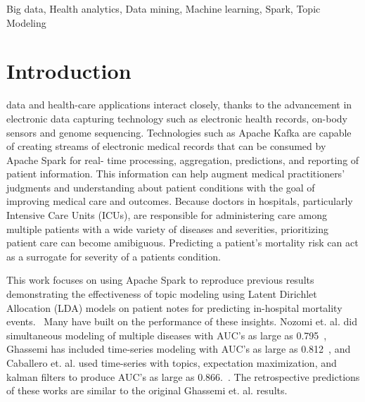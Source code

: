 \documentclass[journal]{IEEEtran}
\begin{document}
\begin{IEEEkeywords}
Big data, Health analytics, Data mining, Machine learning, Spark, Topic Modeling
\end{IEEEkeywords}
%
\IEEEpeerreviewmaketitle



\section{Introduction}
 data and health-care applications interact closely, thanks to the advancement in electronic data capturing technology such as electronic health records, on-body sensors and genome sequencing.  Technologies such as Apache Kafka are capable of creating streams of electronic medical records that can be consumed by Apache Spark for real- time processing, aggregation, predictions, and reporting of patient information.  This information can help augment medical practitioners’ judgments and understanding about patient conditions with the goal of improving medical care and outcomes.  Because doctors in hospitals, particularly Intensive Care Units (ICUs), are responsible for administering care among multiple patients with a wide variety of diseases and severities, prioritizing patient care can become amibiguous.  Predicting a patient's mortality risk can act as a surrogate for severity of a patients condition.

This work focuses on using Apache Spark to reproduce previous results demonstrating the effectiveness of topic modeling using Latent Dirichlet Allocation (LDA) models on patient notes for predicting in-hospital mortality events.~\cite{ghassemi_unfolding_2014}  Many have built on the performance of these insights.  Nozomi et. al. did simultaneous modeling of multiple diseases with AUC's as large as 0.795~\cite{mozomi_2015}, Ghassemi has included time-series modeling with AUC's as large as 0.812~\cite{ghassemi_2015}, and Caballero et. al. used time-series with topics, expectation maximization, and kalman filters to produce AUC's as large as 0.866.~\cite{caballero_2015}.  The retrospective predictions of these works are similar to the original Ghassemi et. al. results.
\end{document}
